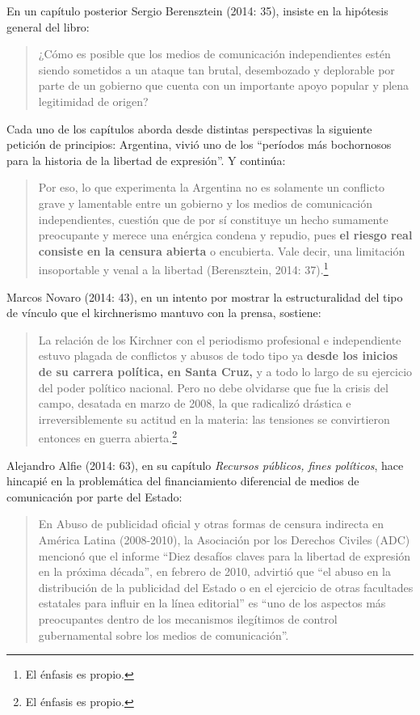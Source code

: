 En un capítulo posterior Sergio Berensztein (2014: 35), insiste en la hipótesis general del libro:

\begin{quote}
¿Cómo es posible que los medios de comunicación independientes estén siendo sometidos a un ataque tan brutal, desembozado y deplorable por parte de un gobierno que cuenta con un importante apoyo popular y plena legitimidad de origen?
\end{quote}

Cada uno de los capítulos aborda desde distintas perspectivas la siguiente petición de principios: Argentina, vivió uno de los \enquote{períodos más bochornosos para la historia de la libertad de expresión}. Y continúa:

\begin{quote}
Por eso, lo que experimenta la Argentina no es solamente un conflicto grave y lamentable entre un gobierno y los medios de comunicación independientes, cuestión que de por sí constituye un hecho sumamente preocupante y merece una enérgica condena y repudio, pues \textbf{el riesgo real consiste en la censura abierta} o encubierta. Vale decir, una limitación insoportable y venal a la libertad (Berensztein, 2014: 37).\footnote{El énfasis es propio.}
\end{quote}

Marcos Novaro (2014: 43), en un intento por mostrar la estructuralidad del tipo de vínculo que el kirchnerismo mantuvo con la prensa, sostiene:

\begin{quote}
La relación de los Kirchner con el periodismo profesional e independiente estuvo plagada de conflictos y abusos de todo tipo ya \textbf{desde los inicios de su carrera política, en Santa Cruz,} y a todo lo largo de su ejercicio del poder político nacional. Pero no debe olvidarse que fue la crisis del campo, desatada en marzo de 2008, la que radicalizó drástica e irreversiblemente su actitud en la materia: las tensiones se convirtieron entonces en guerra abierta.\footnote{El énfasis es propio.}
\end{quote}

Alejandro Alfie (2014: 63), en su capítulo \emph{Recursos públicos, fines políticos}, hace hincapié en la problemática del financiamiento diferencial de medios de comunicación por parte del Estado:

\begin{quote}
En Abuso de publicidad oficial y otras formas de censura indirecta en América Latina (2008-2010), la Asociación por los Derechos Civiles (ADC) mencionó que el informe \enquote{Diez desafíos claves para la libertad de expresión en la próxima década}, en febrero de 2010, advirtió que \enquote{el abuso en la distribución de la publicidad del Estado o en el ejercicio de otras facultades estatales para influir en la línea editorial} es \enquote{uno de los aspectos más preocupantes dentro de los mecanismos ilegítimos de control gubernamental sobre los medios de comunicación}.
\end{quote}

